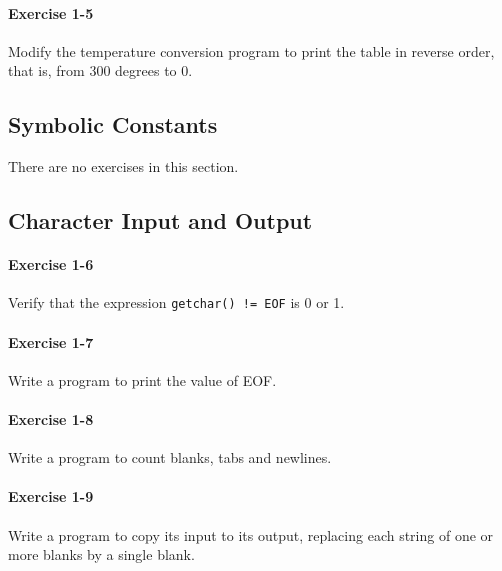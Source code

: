 		\paragraph{Exercise 1-5}
			Modify the temperature conversion program to print the table in reverse
			order, that is, from 300 degrees to 0.

			\hfill{}\cite[p.~14]{knr}
			

	\newpage
	\subsection{Symbolic Constants}
	There are no exercises in this section.

	\newpage
	\subsection{Character Input and Output}
		\paragraph{Exercise 1-6}
			Verify that the expression \lstinline{getchar() != EOF} is 0 or 1.

			\hfill{}\cite[p.~17]{knr}
			

		\paragraph{Exercise 1-7}
			Write a program to print the value of EOF.

			\hfill{}\cite[p.~17]{knr}
			

		\paragraph{Exercise 1-8}
			Write a program to count blanks, tabs and newlines.

			\hfill{}\cite[p.~20]{knr}
			

		\paragraph{Exercise 1-9}
			Write a program to copy its input to its output, replacing each string
			of one or more blanks by a single blank.

			\hfill{}\cite[p.~20]{knr}
			

